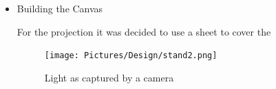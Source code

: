 \begin{itemize}
\item Building the Canvas

For the projection it was decided to use a sheet to cover the 
\begin{figure}[htbp] 
\centering 
\texttt{[image: Pictures/Design/stand2.png]} 
\caption{Light as captured by a camera} 
\label{fig:CanvasPosition} 
\end{figure}

\end{itemize}